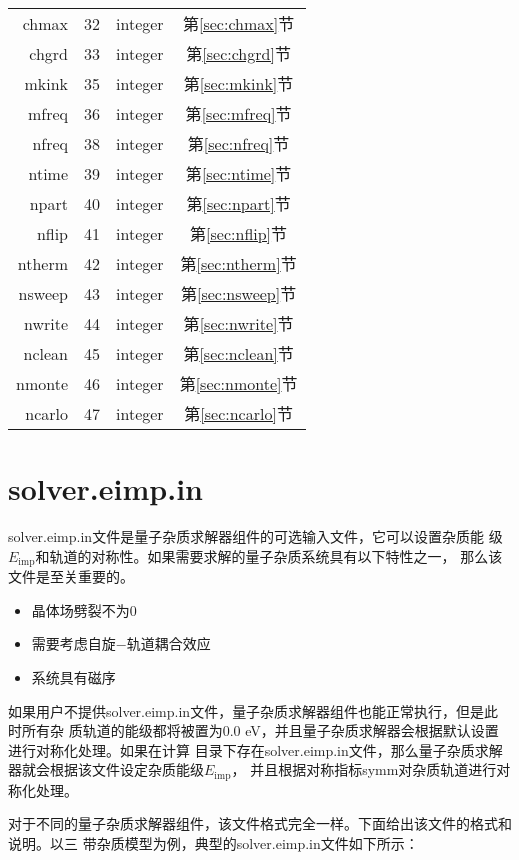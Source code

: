 \begin{longtable}{rccc}
chmax    & 32       & integer  &第\ref{sec:chmax}节 \\
chgrd    & 33       & integer  &第\ref{sec:chgrd}节 \\
mkink    & 35       & integer  &第\ref{sec:mkink}节 \\
mfreq    & 36       & integer  &第\ref{sec:mfreq}节 \\
nfreq    & 38       & integer  &第\ref{sec:nfreq}节 \\
ntime    & 39       & integer  &第\ref{sec:ntime}节 \\
npart    & 40       & integer  &第\ref{sec:npart}节 \\
nflip    & 41       & integer  &第\ref{sec:nflip}节 \\
ntherm   & 42       & integer  &第\ref{sec:ntherm}节\\
nsweep   & 43       & integer  &第\ref{sec:nsweep}节\\
nwrite   & 44       & integer  &第\ref{sec:nwrite}节\\
nclean   & 45       & integer  &第\ref{sec:nclean}节\\
nmonte   & 46       & integer  &第\ref{sec:nmonte}节\\
ncarlo   & 47       & integer  &第\ref{sec:ncarlo}节\\
\hline
\hline
\end{longtable}

\section{solver.eimp.in}
\label{sec:sei}

solver.eimp.in文件是{\iqist}量子杂质求解器组件的可选输入文件，它可以设置杂质能
级$E_{\text{imp}}$和轨道的对称性。如果需要求解的量子杂质系统具有以下特性之一，
那么该文件是至关重要的。
\begin{itemize}
\item 晶体场劈裂不为0
\item 需要考虑自旋$-$轨道耦合效应
\item 系统具有磁序
\end{itemize}
如果用户不提供solver.eimp.in文件，量子杂质求解器组件也能正常执行，但是此时所有杂
质轨道的能级都将被置为0.0 eV，并且量子杂质求解器会根据默认设置进行对称化处理。如果在计算
目录下存在solver.eimp.in文件，那么量子杂质求解器就会根据该文件设定杂质能级$E_{\text{imp}}$，
并且根据对称指标symm对杂质轨道进行对称化处理。

对于不同的量子杂质求解器组件，该文件格式完全一样。下面给出该文件的格式和说明。以三
带杂质模型为例，典型的solver.eimp.in文件如下所示：

